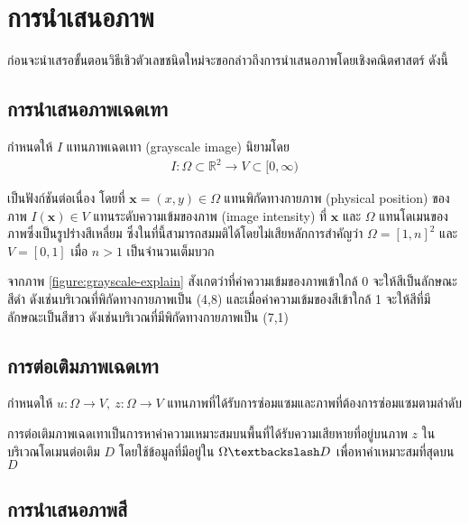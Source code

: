 \section{การนำเสนอภาพ}

\hspace{1cm} ก่อนจะนำเสรอขั้นตอนวิธีเชิวตัวเลขชนิดใหม่จะขอกล่าวถึงการนำเสนอภาพโดยเชิงคณิตศาสตร์ ดังนี้

\subsection{การนำเสนอภาพเฉดเทา}

\hspace{1cm} กำหนดให้ $I$ แทนภาพเฉดเทา (grayscale image) นิยามโดย
\begin{align*}
    I : \Omega \subset \mathbb{R}^2 \rightarrow V \subset [0,\infty)	
\end{align*}

 เป็นฟังก์ชันต่อเนื่อง โดยที่ $ \mathbf{x} = (x,y) \in \Omega $ แทนพิกัดทางกายภาพ (physical position) ของภาพ $ I(\mathbf{x}) \in V $ แทนระดับความเข้มของภาพ (image intensity) ที่ $ \mathbf{x} $ และ $ \Omega $ แทนโดเมนของภาพซึ่งเป็นรูปร่างสีเหลี่ยม ซึ่งในที่นี้สามารถสมมติได้โดยไม่เสียหลักการสำคัญว่า $ \Omega = [1,n]^2 $ และ $ V = [0,1] $ เมื่อ $n>1$ เป็นจำนวนเต็มบวก 



\hspace{1cm} จากภาพ \ref{figure:grayscale-explain} สังเกตว่าที่ค่าความเข้มของภาพเข้าใกล้ 0 จะให้สีเป็นลักษณะสีดำ ดังเช่นบริเวณที่พิกัดทางกายภาพเป็น (4,8) และเมื่อค่าความเข้มของสีเข้าใกล้ 1 จะให้สีที่มีลักษณะเป็นสีขาว ดังเช่นบริเวณที่มีพิกัดทางกายภาพเป็น (7,1)

\subsection{การต่อเติมภาพเฉดเทา}

\hspace{1cm} กำหนดให้ $ u: \Omega \rightarrow V,\ z: \Omega \rightarrow V$ แทนภาพที่ได้รับการซ่อมแซมและภาพที่ต้องการซ่อมแซมตามลำดับ



\hspace{1cm} การต่อเติมภาพเฉดเทาเป็นการหาค่าความเหมาะสมบนพื้นที่ได้รับความเสียหายที่อยู่บนภาพ $z$ ในบริเวณโดเมนต่อเติม $D$ โดยใช้ข้อมูลที่มีอยู่ใน $\Omega \textbackslash D$ เพื่อหาค่าเหมาะสมที่สุดบน $D$ 

\subsection{การนำเสนอภาพสี}

